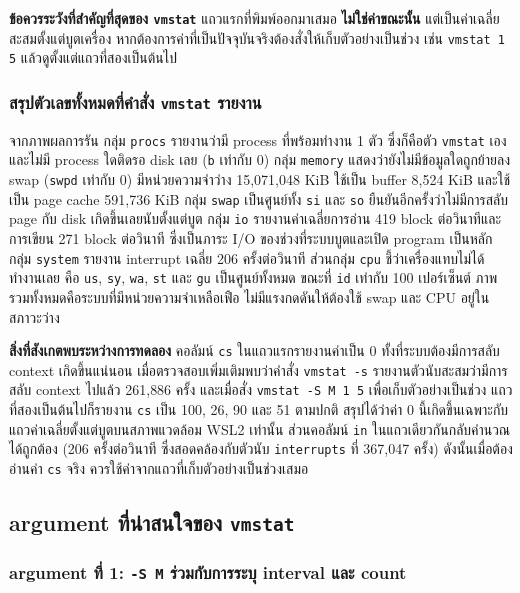 \documentclass[a4paper,11pt]{article}
\newcommand{\code}[1]{\texttt{#1}}
\begin{document}
\textbf{ข้อควรระวังที่สำคัญที่สุดของ \code{vmstat}} แถวแรกที่พิมพ์ออกมาเสมอ \textbf{ไม่ใช่ค่าขณะนั้น} แต่เป็นค่าเฉลี่ยสะสมตั้งแต่บูตเครื่อง หากต้องการค่าที่เป็นปัจจุบันจริงต้องสั่งให้เก็บตัวอย่างเป็นช่วง เช่น \code{vmstat 1 5} แล้วดูตั้งแต่แถวที่สองเป็นต้นไป

\subsubsection{สรุปตัวเลขทั้งหมดที่คำสั่ง \code{vmstat} รายงาน}

จากภาพผลการรัน กลุ่ม \code{procs} รายงานว่ามี process ที่พร้อมทำงาน 1 ตัว ซึ่งก็คือตัว \code{vmstat} เอง และไม่มี process ใดติดรอ disk เลย (\code{b} เท่ากับ 0) กลุ่ม \code{memory} แสดงว่ายังไม่มีข้อมูลใดถูกย้ายลง swap (\code{swpd} เท่ากับ 0) มีหน่วยความจำว่าง 15{,}071{,}048 KiB ใช้เป็น buffer 8{,}524 KiB และใช้เป็น page cache 591{,}736 KiB กลุ่ม \code{swap} เป็นศูนย์ทั้ง \code{si} และ \code{so} ยืนยันอีกครั้งว่าไม่มีการสลับ page กับ disk เกิดขึ้นเลยนับตั้งแต่บูต กลุ่ม \code{io} รายงานค่าเฉลี่ยการอ่าน 419 block ต่อวินาทีและการเขียน 271 block ต่อวินาที ซึ่งเป็นภาระ I/O ของช่วงที่ระบบบูตและเปิด program เป็นหลัก กลุ่ม \code{system} รายงาน interrupt เฉลี่ย 206 ครั้งต่อวินาที ส่วนกลุ่ม \code{cpu} ชี้ว่าเครื่องแทบไม่ได้ทำงานเลย คือ \code{us}, \code{sy}, \code{wa}, \code{st} และ \code{gu} เป็นศูนย์ทั้งหมด ขณะที่ \code{id} เท่ากับ 100 เปอร์เซ็นต์ ภาพรวมทั้งหมดคือระบบที่มีหน่วยความจำเหลือเฟือ ไม่มีแรงกดดันให้ต้องใช้ swap และ CPU อยู่ในสภาวะว่าง

\textbf{สิ่งที่สังเกตพบระหว่างการทดลอง} คอลัมน์ \code{cs} ในแถวแรกรายงานค่าเป็น 0 ทั้งที่ระบบต้องมีการสลับ context เกิดขึ้นแน่นอน เมื่อตรวจสอบเพิ่มเติมพบว่าคำสั่ง \code{vmstat -s} รายงานตัวนับสะสมว่ามีการสลับ context ไปแล้ว 261{,}886 ครั้ง และเมื่อสั่ง \code{vmstat -S M 1 5} เพื่อเก็บตัวอย่างเป็นช่วง แถวที่สองเป็นต้นไปก็รายงาน \code{cs} เป็น 100, 26, 90 และ 51 ตามปกติ สรุปได้ว่าค่า 0 นี้เกิดขึ้นเฉพาะกับแถวค่าเฉลี่ยตั้งแต่บูตบนสภาพแวดล้อม WSL2 เท่านั้น ส่วนคอลัมน์ \code{in} ในแถวเดียวกันกลับคำนวณได้ถูกต้อง (206 ครั้งต่อวินาที ซึ่งสอดคล้องกับตัวนับ \code{interrupts} ที่ 367{,}047 ครั้ง) ดังนั้นเมื่อต้องอ่านค่า \code{cs} จริง ควรใช้ค่าจากแถวที่เก็บตัวอย่างเป็นช่วงเสมอ

\subsection{argument ที่น่าสนใจของ \code{vmstat}}

\subsubsection{argument ที่ 1: \code{-S M} ร่วมกับการระบุ interval และ count}
\end{document}
